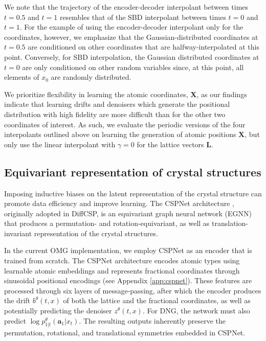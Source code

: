 We note that the trajectory of the encoder-decoder interpolant between times $t=0.5$ and $t=1$ resembles that of the SBD interpolant between times $t=0$ and $t=1$. For the example of using the encoder-decoder interpolant only for the coordinates, however, we emphasize that the Gaussian-distributed coordinates at $t=0.5$ are conditioned on other coordinates that are halfway-interpolated at this point. Conversely, for SBD interpolation, the Gaussian distributed coordinates at $t=0$ are only conditioned on other random variables since, at this point, all elements of $x_0$ are randomly distributed.

We prioritize flexibility in learning the atomic coordinates, $\bm{X}$, as our findings indicate that learning drifts and denoisers which generate the positional distribution with high fidelity are more difficult than for the other two coordinates of interest.
As such, we evaluate the periodic versions of the four interpolants outlined above on learning the generation of atomic positions $\bm{X}$, but only use the linear interpolant with $\gamma=0$ for the lattice vectors $\bm{L}$.

\subsection{Equivariant representation of crystal structures}

Imposing inductive biases on the latent representation of the crystal structure can promote data efficiency and improve learning. 
The CSPNet architecture \citep{jiao_crystal_2023}, originally adopted in DiffCSP, is an equivariant graph neural network (EGNN) \citep{satorras_equivariant_2021} that produces a permutation- and rotation-equivariant, as well as translation-invariant representation of the crystal structures.

In the current OMG implementation, we employ CSPNet as an encoder that is trained from scratch. %
The CSPNet architecture encodes atomic types using learnable atomic embeddings and represents fractional coordinates through sinusoidal positional encodings (see Appendix \ref{app:cspnet}). These features are processed through six layers of message-passing, after which the encoder produces the drift $b^\theta(t,x)$ of both the lattice and the fractional coordinates, as well as potentially predicting the denoiser $z^\theta(t,x)$. For DNG, the network must also predict $\log p_{1|t}^\theta(\bm{a}_1|x_{t})$. The resulting outputs inherently preserve the permutation, rotational, and translational symmetries embedded in CSPNet. 

